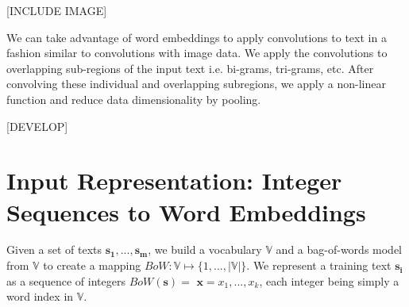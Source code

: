 [INCLUDE IMAGE]

We can take advantage of word embeddings to apply convolutions to text in a fashion similar to convolutions with
image data. We apply the convolutions to overlapping sub-regions of the input text i.e. bi-grams, tri-grams, etc.
After convolving these individual and overlapping subregions, we apply a non-linear function and reduce data dimensionality
by pooling.

[DEVELOP]

\section{Input Representation: Integer Sequences to Word Embeddings}
Given a set of texts $\bm{s_1},...,\bm{s_m}$, we build a vocabulary $\mathbb{V}$ and a bag-of-words model from $\mathbb{V}$ to create a mapping $BoW:\mathbb{V} \mapsto \{1,...,|\mathbb{V}|\}$.
We represent a training text $\bm{s_i}$ as a sequence of integers $BoW(\bm{s})=$ $\bm{x} = x_1,...,x_k$, each integer being simply a word index
in $\mathbb{V}$.

